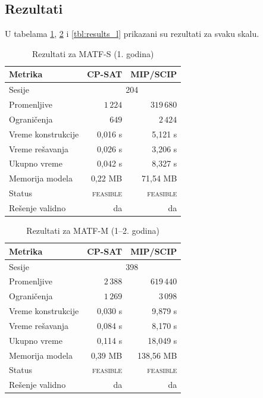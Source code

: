 \documentclass[12pt,oneside]{memoir}
\begin{document}
\subsection{Rezultati}
\label{sec:rezultati}

U tabelama \ref{tbl:results_s}, \ref{tbl:results_m} i
\ref{tbl:results_l} prikazani su rezultati za svaku skalu.

\begin{table}[ht]
\centering
\caption{Rezultati za MATF-S (1. godina)}
\label{tbl:results_s}
\begin{tabular}{lrr}
\toprule
\textbf{Metrika} & \textbf{CP-SAT} & \textbf{MIP/SCIP} \\
\midrule
Sesije                 & \multicolumn{2}{c}{204} \\
Promenljive            & $1\,224$        & $319\,680$ \\
Ograničenja            & $649$           & $2\,424$ \\
Vreme konstrukcije     & 0,016 s         & 5,121 s \\
Vreme rešavanja        & 0,026 s         & 3,206 s \\
Ukupno vreme           & 0,042 s         & 8,327 s \\
Memorija modela        & 0,22 MB         & 71,54 MB \\
Status                 & \textsc{feasible} & \textsc{feasible} \\
Rešenje validno        & da              & da \\
\bottomrule
\end{tabular}
\end{table}

\begin{table}[ht]
\centering
\caption{Rezultati za MATF-M (1--2. godina)}
\label{tbl:results_m}
\begin{tabular}{lrr}
\toprule
\textbf{Metrika} & \textbf{CP-SAT} & \textbf{MIP/SCIP} \\
\midrule
Sesije                 & \multicolumn{2}{c}{398} \\
Promenljive            & $2\,388$        & $619\,440$ \\
Ograničenja            & $1\,269$        & $3\,098$ \\
Vreme konstrukcije     & 0,030 s         & 9,879 s \\
Vreme rešavanja        & 0,084 s         & 8,170 s \\
Ukupno vreme           & 0,114 s         & 18,049 s \\
Memorija modela        & 0,39 MB         & 138,56 MB \\
Status                 & \textsc{feasible} & \textsc{feasible} \\
Rešenje validno        & da              & da \\
\bottomrule
\end{tabular}
\end{table}
\end{document}
